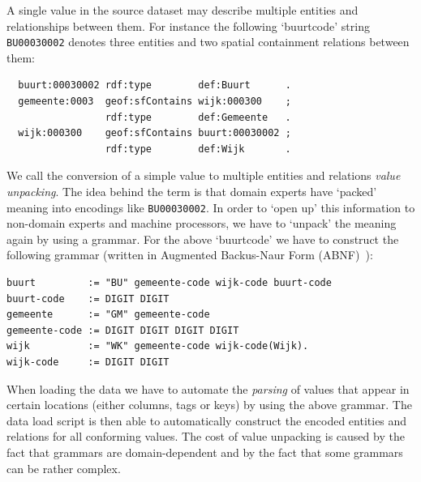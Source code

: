 \documentclass[a4paper]{scrartcl}
\newcommand{\textt}[1]{{\small \texttt{#1}}}
\begin{document}
A single value in the source dataset may describe multiple entities
and relationships between them.  For instance the following
`buurtcode' string \textt{BU00030002} denotes three entities and two
spatial containment relations between them:

\begin{verbatim}
  buurt:00030002 rdf:type        def:Buurt      .
  gemeente:0003  geof:sfContains wijk:000300    ;
                 rdf:type        def:Gemeente   .
  wijk:000300    geof:sfContains buurt:00030002 ;
                 rdf:type        def:Wijk       .
\end{verbatim}

We call the conversion of a simple value to multiple entities and
relations \emph{value unpacking}.  The idea behind the term is that
domain experts have `packed' meaning into encodings like
\texttt{BU00030002}.  In order to `open up' this information to
non-domain experts and machine processors, we have to `unpack' the
meaning again by using a grammar.  For the above `buurtcode' we have
to construct the following grammar (written in Augmented Backus-Naur
Form (ABNF)~\cite{Crocker2008}):

\begin{verbatim}
buurt         := "BU" gemeente-code wijk-code buurt-code
buurt-code    := DIGIT DIGIT
gemeente      := "GM" gemeente-code
gemeente-code := DIGIT DIGIT DIGIT DIGIT
wijk          := "WK" gemeente-code wijk-code(Wijk).
wijk-code     := DIGIT DIGIT
\end{verbatim}

When loading the data we have to automate the \emph{parsing} of values
that appear in certain locations (either columns, tags or keys) by
using the above grammar.  The data load script is then able to
automatically construct the encoded entities and relations for all
conforming values.  The cost of value unpacking is caused by the fact
that grammars are domain-dependent and by the fact that some grammars
can be rather complex.

\end{document}
